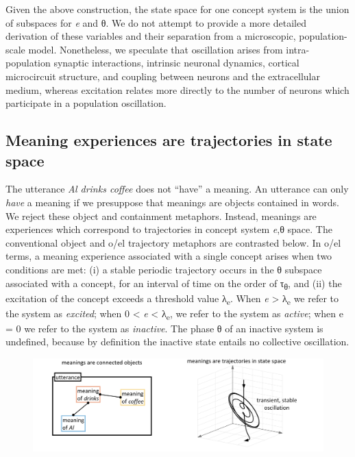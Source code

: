   Given the above construction, the state space for one concept system is the union of subspaces for \textit{e} and θ. We do not attempt to provide a more detailed derivation of these variables and their separation from a microscopic, population-scale model. Nonetheless, we speculate that oscillation arises from intra-population synaptic interactions, intrinsic neuronal dynamics, cortical microcircuit structure, and coupling between neurons and the extracellular medium, whereas excitation relates more directly to the number of neurons which participate in a population oscillation.  

\subsection{Meaning experiences are trajectories in state space}

The utterance \textit{Al drinks coffee} does not “have” a meaning. An utterance can only \textit{have} a meaning if we presuppose that meanings are objects contained in words. We reject these object and containment metaphors. Instead, meanings are experiences which correspond to trajectories in concept system \textit{e},θ space. The conventional object and o/el trajectory metaphors are contrasted below. In o/el terms, a meaning experience associated with a single concept arises when two conditions are met: (i) a stable periodic trajectory occurs in the θ subspace associated with a concept, for an interval of time on the order of τ\textsubscript{θ}, and (ii) the excitation of the concept exceeds a threshold value λ\textsubscript{e}. When \textit{e} > λ\textsubscript{e} we refer to the system as \textit{excited}; when 0 < \textit{e} < λ\textsubscript{e}, we refer to the system as \textit{active}; when e = 0 we refer to the system as \textit{inactive}. The phase θ of an inactive system is undefined, because by definition the inactive state entails no collective oscillation. 

  
\begin{figure}
\includegraphics[width=\textwidth]{figures/Tilsen-img13.png}
\caption{\missingcaption}
\label{fig:2:6}
\end{figure}
 

